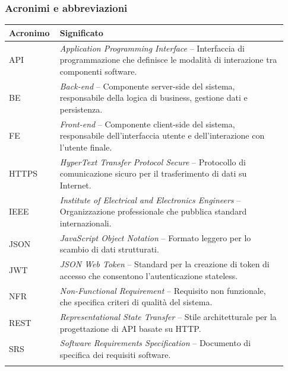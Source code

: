 \subsubsection{Acronimi e abbreviazioni}
\label{subsec:acronimi}

\begin{longtable}{p{0.15\linewidth} p{0.78\linewidth}}
\toprule
\textbf{Acronimo} & \textbf{Significato} \\
\midrule
\endhead
\bottomrule
\endfoot

API & \textit{Application Programming Interface} -- Interfaccia di programmazione che definisce le modalità di interazione tra componenti software. \\
\addlinespace

BE & \textit{Back-end} -- Componente server-side del sistema, responsabile della logica di business, gestione dati e persistenza. \\
\addlinespace

FE & \textit{Front-end} -- Componente client-side del sistema, responsabile dell'interfaccia utente e dell'interazione con l'utente finale. \\
\addlinespace

HTTPS & \textit{HyperText Transfer Protocol Secure} -- Protocollo di comunicazione sicuro per il trasferimento di dati su Internet. \\
\addlinespace

IEEE & \textit{Institute of Electrical and Electronics Engineers} -- Organizzazione professionale che pubblica standard internazionali. \\
\addlinespace

JSON & \textit{JavaScript Object Notation} -- Formato leggero per lo scambio di dati strutturati. \\
\addlinespace

JWT & \textit{JSON Web Token} -- Standard per la creazione di token di accesso che consentono l'autenticazione stateless. \\
\addlinespace

NFR & \textit{Non-Functional Requirement} -- Requisito non funzionale, che specifica criteri di qualità del sistema. \\
\addlinespace

REST & \textit{Representational State Transfer} -- Stile architetturale per la progettazione di API basate su HTTP. \\
\addlinespace

SRS & \textit{Software Requirements Specification} -- Documento di specifica dei requisiti software. \\
\addlinespace


\end{longtable}
